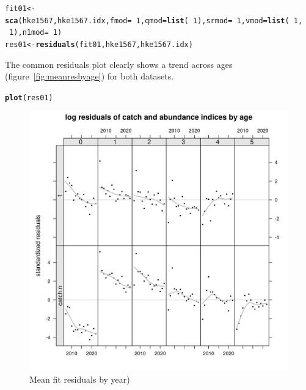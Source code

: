 \documentclass[a4paper,english,11pt]{article}\usepackage[]{graphicx}\usepackage[]{xcolor}
\makeatletter
\newcommand{\hlnum}[1]{\textcolor[rgb]{0.686,0.059,0.569}{#1}}%
\newcommand{\hlopt}[1]{\textcolor[rgb]{0,0,0}{#1}}%
\newcommand{\hldef}[1]{\textcolor[rgb]{0.345,0.345,0.345}{#1}}%
\newcommand{\hlkwb}[1]{\textcolor[rgb]{0.69,0.353,0.396}{#1}}%
\newcommand{\hlkwc}[1]{\textcolor[rgb]{0.333,0.667,0.333}{#1}}%
\newcommand{\hlkwd}[1]{\textcolor[rgb]{0.737,0.353,0.396}{\textbf{#1}}}%
\newenvironment{kframe}{%
 \def\at@end@of@kframe{}%
 \ifinner\ifhmode%
  \def\at@end@of@kframe{\end{minipage}}%
  \begin{minipage}{\columnwidth}%
 \fi\fi%
 \def\FrameCommand##1{\hskip\@totalleftmargin \hskip-\fboxsep
 \colorbox{shadecolor}{##1}\hskip-\fboxsep
     \hskip-\linewidth \hskip-\@totalleftmargin \hskip\columnwidth}%
 \MakeFramed {\advance\hsize-\width
   \@totalleftmargin\z@ \linewidth\hsize
   \@setminipage}}%
 {\par\unskip\endMakeFramed%
 \at@end@of@kframe}
\newenvironment{knitrout}{}{} %
\makeatother
\begin{document}
\begin{knitrout}
\color{fgcolor}\begin{kframe}
\begin{alltt}
\hldef{fit01} \hlkwb{<-} \hlkwd{sca}\hldef{(hke1567, hke1567.idx,} \hlkwc{fmod} \hldef{=} \hlopt{~}\hlnum{1}\hldef{,} \hlkwc{qmod} \hldef{=} \hlkwd{list}\hldef{(}\hlopt{~}\hlnum{1}\hldef{),} \hlkwc{srmod} \hldef{=} \hlopt{~}\hlnum{1}\hldef{,} \hlkwc{vmod} \hldef{=} \hlkwd{list}\hldef{(}\hlopt{~}\hlnum{1}\hldef{,}
    \hlopt{~}\hlnum{1}\hldef{),} \hlkwc{n1mod} \hldef{=} \hlopt{~}\hlnum{1}\hldef{)}
\hldef{res01} \hlkwb{<-} \hlkwd{residuals}\hldef{(fit01, hke1567, hke1567.idx)}
\end{alltt}
\end{kframe}
\end{knitrout}

The common residuals plot  clearly shows a trend across ages (figure~\ref{fig:meanresbyage}) for both datasets. 

\begin{knitrout}
\color{fgcolor}\begin{kframe}
\begin{alltt}
\hlkwd{plot}\hldef{(res01)}
\end{alltt}
\end{kframe}\begin{figure}[H]

{\centering \includegraphics[width=.9\linewidth]{figure/meanresbyyear-1} 

}

\caption[Mean fit residuals by year)]{Mean fit residuals by year)}\label{fig:meanresbyyear}
\end{figure}

\end{knitrout}
\end{document}
